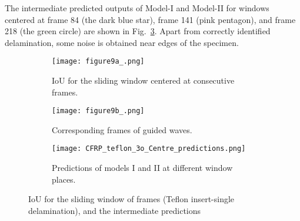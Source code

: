 \begin{sloppypar}
	The intermediate predicted outputs of Model-I and Model-II for windows centered at frame 84 (the dark blue star), frame 141 (pink pentagon), and frame 218 (the green circle) are shown in Fig.~\ref{fig:CFRP_teflon_3o_intermediate}.
	Apart from correctly identified delamination, some noise is obtained near edges of the specimen.
	\begin{figure} [!ht]
		\begin{subfigure}[b]{1\textwidth}
			\centering
			\texttt{[image: figure9a\_.png]}
			\caption{IoU for the sliding window centered at consecutive frames.}
			\label{fig:CFRP_Teflon_3o_IoU_}
		\end{subfigure}
		\par\medskip
		\begin{subfigure}[b]{1\textwidth}
			\centering
			\texttt{[image: figure9b\_.png]}
			\caption{Corresponding frames of guided waves.} 
			\label{fig:CFRP_teflon_3o_shapes_}
		\end{subfigure}
		\par\medskip
		\begin{subfigure}[b]{1\textwidth}
			\centering
			\texttt{[image: CFRP\_teflon\_3o\_Centre\_predictions.png]}
			\caption{Predictions of models I and II at different window places.} 
			\label{fig:CFRP_teflon_3o_intermediate}
		\end{subfigure}
		\caption{IoU for the sliding window of frames (Teflon insert-single delamination), and the intermediate predictions}
		\label{fig:CFRP_Teflon_3o_IoU_centre_window}
	\end{figure} 
	

\end{sloppypar}
